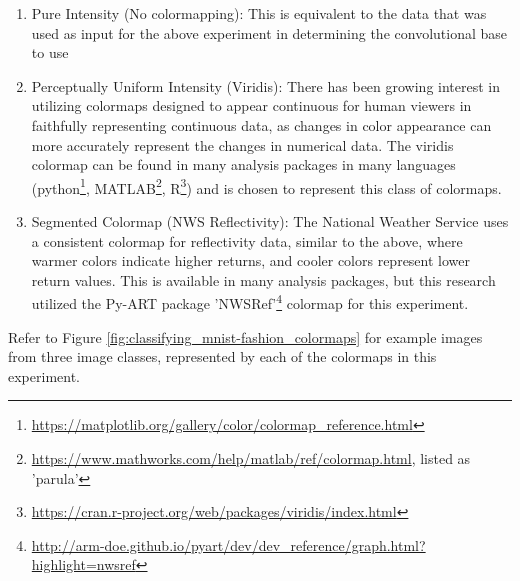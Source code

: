 \begin{enumerate}
	\item Pure Intensity (No colormapping): This is equivalent to the data that was used as input for the above experiment in determining the convolutional base to use
	\item Perceptually Uniform Intensity (Viridis): There has been growing interest\cite{kovesi2015good} in utilizing colormaps designed to appear continuous for human viewers in faithfully representing continuous data, as changes in color appearance can more accurately represent the changes in numerical data. 
	The viridis colormap can be found in many analysis packages in many languages (python\footnote{\url{https://matplotlib.org/gallery/color/colormap_reference.html}}, 
	MATLAB\footnote{\url{https://www.mathworks.com/help/matlab/ref/colormap.html}, listed as 'parula'}, 
	R\footnote{\url{https://cran.r-project.org/web/packages/viridis/index.html}}) and is chosen to represent this class of colormaps.
	\item Segmented Colormap (NWS Reflectivity): The National Weather Service uses a consistent colormap for reflectivity data, similar to the above, where warmer colors indicate higher returns, and cooler colors represent lower return values. 
	This is available in many analysis packages, but this research utilized the Py-ART package\cite{helmus2016python} 'NWSRef'\footnote{\url{http://arm-doe.github.io/pyart/dev/dev_reference/graph.html?highlight=nwsref}} colormap for this experiment.
\end{enumerate}

Refer to Figure \ref{fig:classifying_mnist-fashion_colormaps} for example images from three image classes, represented by each of the colormaps in this experiment.

